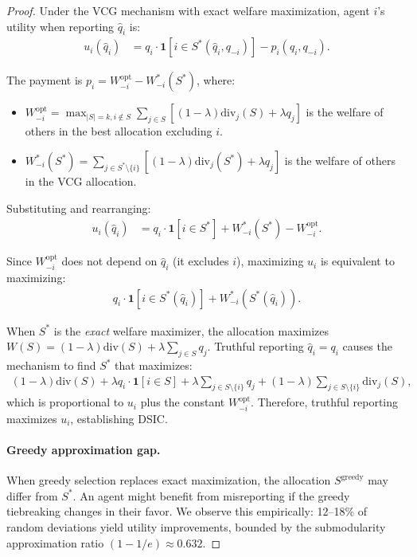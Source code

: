 \documentclass[10pt]{article}
\begin{document}
\begin{proof}
Under the VCG mechanism with exact welfare maximization, agent $i$'s utility when reporting $\hat{q}_i$ is:
\begin{align}
u_i(\hat{q}_i) &= q_i \cdot \mathbf{1}[i \in S^*(\hat{q}_i, q_{-i})] - p_i(\hat{q}_i, q_{-i}).
\end{align}

The payment is $p_i = W_{-i}^{\text{opt}} - W_{-i}^*(S^*)$, where:
\begin{itemize}
\item $W_{-i}^{\text{opt}} = \max_{|S|=k, i \notin S} \sum_{j \in S}[(1-\lambda)\text{div}_j(S) + \lambda q_j]$ is the welfare of others in the best allocation excluding $i$.
\item $W_{-i}^*(S^*) = \sum_{j \in S^* \setminus \{i\}}[(1-\lambda)\text{div}_j(S^*) + \lambda q_j]$ is the welfare of others in the VCG allocation.
\end{itemize}

Substituting and rearranging:
\begin{align}
u_i(\hat{q}_i) &= q_i \cdot \mathbf{1}[i \in S^*] + W_{-i}^*(S^*) - W_{-i}^{\text{opt}}.
\end{align}

Since $W_{-i}^{\text{opt}}$ does not depend on $\hat{q}_i$ (it excludes $i$), maximizing $u_i$ is equivalent to maximizing:
\begin{align}
q_i \cdot \mathbf{1}[i \in S^*(\hat{q}_i)] + W_{-i}^*(S^*(\hat{q}_i)).
\end{align}

When $S^*$ is the \emph{exact} welfare maximizer, the allocation maximizes $W(S) = (1-\lambda)\text{div}(S) + \lambda \sum_{j \in S} q_j$.
Truthful reporting $\hat{q}_i = q_i$ causes the mechanism to find $S^*$ that maximizes:
\begin{align}
(1-\lambda)\text{div}(S) + \lambda q_i \cdot \mathbf{1}[i \in S] + \lambda \sum_{j \in S \setminus \{i\}} q_j + (1-\lambda)\sum_{j \in S \setminus \{i\}} \text{div}_j(S),
\end{align}
which is proportional to $u_i$ plus the constant $W_{-i}^{\text{opt}}$.
Therefore, truthful reporting maximizes $u_i$, establishing DSIC.

\paragraph{Greedy approximation gap.}
When greedy selection replaces exact maximization, the allocation $S^{\text{greedy}}$ may differ from $S^*$.
An agent might benefit from misreporting if the greedy tiebreaking changes in their favor.
We observe this empirically: 12--18\% of random deviations yield utility improvements, bounded by the submodularity approximation ratio $(1-1/e) \approx 0.632$.
\end{proof}
\end{document}
